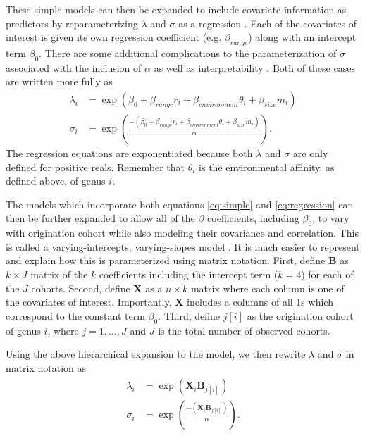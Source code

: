 \documentclass[12pt,letterpaper]{article}
\begin{document}
These simple models can then be expanded to include covariate information as predictors by reparameterizing \(\lambda\) and \(\sigma\) as a regression \citep{Klein2003}. Each of the covariates of interest is given its own regression coefficient (e.g. \(\beta_{range}\)) along with an intercept term \(\beta_{0}\). There are some additional complications to the parameterization of \(\sigma\) associated with the inclusion of \(\alpha\) as well as interpretability \citep{Klein2003}. Both of these cases are written more fully as
\begin{equation}
  \begin{aligned}
    \lambda_{i} &= \exp(\beta_{0} + \beta_{range} r_{i} + \beta_{environment} \theta_{i} + \beta_{size} m_{i}) \\
    \sigma_{i} &= \exp\left(\frac{-(\beta_{0} + \beta_{range} r_{i} + \beta_{environment} \theta_{i} + \beta_{size} m_{i})}{\alpha}\right).
  \end{aligned}
  \label{eq:regression}
\end{equation}
The regression equations are exponentiated because both \(\lambda\) and \(\sigma\) are only defined for positive reals. Remember that \(\theta_{i}\) is the environmental affinity, as defined above, of genus \(i\).


The models which incorporate both equations \ref{eq:simple} and \ref{eq:regression} can then be further expanded to allow all of the \(\beta\) coefficients, including \(\beta_{0}\), to vary with origination cohort while also modeling their covariance and correlation. This is called a varying-intercepts, varying-slopes model \citep{Gelman2007}. It is much easier to represent and explain how this is parameterized using matrix notation. First, define \(\mathbf{B}\) as \(k \times J\) matrix of the \(k\) coefficients including the intercept term (\(k = 4\)) for each of the \(J\) cohorts. Second, define \(\mathbf{X}\) as a \(n \times k\) matrix where each column is one of the covariates of interest. Importantly, \(\mathbf{X}\) includes a columns of all 1s which correspond to the constant term \(\beta_{0}\). Third, define \(j[i]\) as the origination cohort of genus \(i\), where \(j = 1, \dots, J\) and \(J\) is the total number of observed cohorts.

Using the above hierarchical expansion to the model, we then rewrite \(\lambda\) and \(\sigma\) in matrix notation as
\begin{equation}
  \begin{aligned}
    \lambda_{i} &= \exp(\mathbf{X}_{i} \mathbf{B}_{j[i]}) \\
    \sigma_{i} &= \exp\left(\frac{-(\mathbf{X}_{i} \mathbf{B}_{j[i]})}{\alpha}\right). 
  \end{aligned}
  \label{eq:multivariate}
\end{equation}
\end{document}
